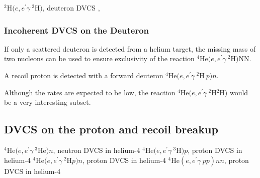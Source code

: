    $^2$H$(e,e^{\prime}\gamma~^2$H$)$,     deuteron DVCS ,

\subsubsection{Incoherent DVCS on the Deuteron}

If only a scattered deuteron is detected from a helium target, the missing mass 
of two nucleons can be used to ensure exclusivity of the reaction 
$^4$He$(e,e^{\prime}\gamma~^2$H$)$NN.

A recoil proton is detected with a forward deuteron
$^4$He$(e,e^{\prime}\gamma~^2$H$~p)n$.

Although the rates are expected to be low, the reaction 
$^4$He$(e,e^{\prime}\gamma~^2$H$^2$H) would be a very interesting subset.

\subsection{DVCS on the proton and recoil breakup}

   $^4$He$(e,e^{\prime}\gamma~^3$He$)n$,  neutron DVCS in  helium-4
   $^4$He$(e,e^{\prime}\gamma~^3$H$)p$,   proton DVCS in  helium-4
   $^4$He$(e,e^{\prime}\gamma~^2$H$p)n$,  proton DVCS in  helium-4
   $^4$He$(e,e^{\prime}\gamma~pp)nn$,     proton DVCS in  helium-4
